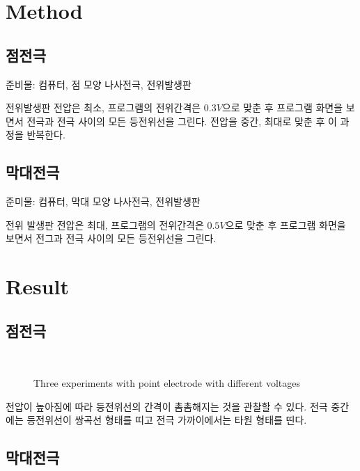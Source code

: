 \documentclass[a4paper]{article}
\begin{document}
\section{Method}
	\subsection{점전극}
		준비물: 컴퓨터, 점 모양 나사전극, 전위발생판   

		전위발생판 전압은 최소, 프로그램의 전위간격은 $0.3V$으로 맞춘 후 프로그램 화면을 보면서 전극과 전극 사이의 모든 등전위선을 그린다. 전압을 중간, 최대로 맞춘 후 이 과정을 반복한다. 

	\subsection{막대전극}
		준미물: 컴퓨터, 막대 모양 나사전극, 전위발생판

		전위 발생판 전압은 최대, 프로그램의 전위간격은 $0.5V$으로 맞춘 후 프로그램 화면을 보면서 전그과 전극 사이의 모든 등전위선을 그린다.

\newpage

\section{Result}
	\subsection{점전극}

		\begin{figure}[h]
				\centering
				\quad
				\\
			\caption{Three experiments with point electrode with different voltages}
		\end{figure}	

		전압이 높아짐에 따라 등전위선의 간격이 촘촘해지는 것을 관찰할 수 있다. 전극 중간에는 등전위선이 쌍곡선 형태를 띠고 전극 가까이에서는 타원 형태를 띤다.  

	\subsection{막대전극}
\end{document}
